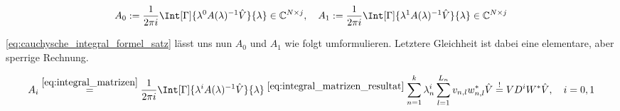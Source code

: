 \begin{align} \label{eq:integral_matrizen}
    A_0 := \frac{1}{2 \pi i} \Int[\Gamma]{\lambda^0 A(\lambda)^{-1} \hat V}{\lambda} \in \C^{N \times j},
    \quad
    A_1 := \frac{1}{2 \pi i} \Int[\Gamma]{\lambda^1 A(\lambda)^{-1} \hat V}{\lambda} \in \C^{N \times j}
\end{align}

\eqref{eq:cauchysche_integral_formel_satz} lässt uns nun $A_0$ und $A_1$ wie folgt umformulieren.
Letztere Gleichheit ist dabei eine elementare, aber sperrige Rechnung.

\begin{align} \label{eq:integral_matrizen_resultat_compact}
    A_i
    \stackrel
    {
        \eqref{eq:integral_matrizen}
    }{=}
    \frac{1}{2 \pi i}
    \Int[\Gamma]
    {
        \lambda^i
        A(\lambda)^{-1}
        \hat V
    }{\lambda}
    \stackrel
    {
        \eqref{eq:integral_matrizen_resultat}
    }{}
    \sum_{n=1}^k
        \lambda_n^i
        \sum_{l=1}^{L_n}
            v_{n, l} w_{n, l}^\ast
    \hat V
    \stackrel{!}{=}
    V D^i W^\ast \hat V,
    \quad
    i = 0, 1
\end{align}
